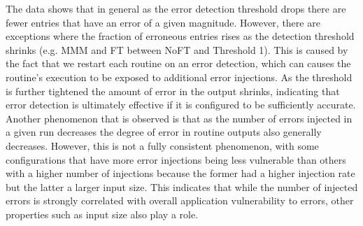 \documentclass{sig-alternate}
\newcommand{\sui}[1]{%
  \textcolor{green}{SC-#1}
}
\newcommand{\greg}[1]{%
  \textcolor{blue}{GB: #1}
}
\begin{document}
{The data shows that in general as the error detection threshold drops there are fewer entries that have an error of a given magnitude.
However, there are exceptions where the fraction of erroneous entries rises as the detection threshold shrinks (e.g. MMM and FT between NoFT and Threshold 1).
This is caused by the fact that we restart each routine on an error detection, which can causes the routine's execution to be exposed to additional error injections.
As the threshold is further tightened the amount of error in the output shrinks, indicating that error detection is ultimately effective if it is configured to be sufficiently accurate.
Another phenomenon that is observed is that as the number of errors injected in a given run decreases the degree of error in routine outputs also generally decreases.
However, this is not a fully consistent phenomenon, with some configurations that have more error injections being less vulnerable than others with a higher number of injections because the former had a higher injection rate but the latter a larger input size.
This indicates that while the number of injected errors is strongly correlated with overall application vulnerability to errors, other properties such as input size also play a role.


}
\end{document}
